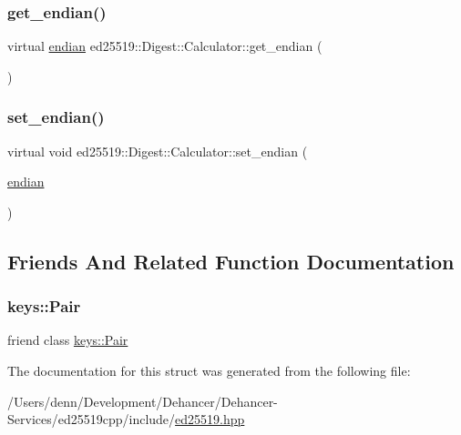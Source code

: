 \subsubsection{\texorpdfstring{get\+\_\+endian()}{get\_endian()}}
{\footnotesize\ttfamily virtual \mbox{\hyperlink{structed25519_1_1_digest_1_1_calculator_a9bbea874787f93cdf4841b30c1c0d9a3}{endian}} ed25519\+::\+Digest\+::\+Calculator\+::get\+\_\+endian (\begin{DoxyParamCaption}{ }\end{DoxyParamCaption})\hspace{0.3cm}{\ttfamily [pure virtual]}}

\mbox{\label{structed25519_1_1_digest_1_1_calculator_a2e5de160d53feaef2ce5c0240e8e13ea}} 
\subsubsection{\texorpdfstring{set\+\_\+endian()}{set\_endian()}}
{\footnotesize\ttfamily virtual void ed25519\+::\+Digest\+::\+Calculator\+::set\+\_\+endian (\begin{DoxyParamCaption}\item[{\mbox{\hyperlink{structed25519_1_1_digest_1_1_calculator_a9bbea874787f93cdf4841b30c1c0d9a3}{endian}}}]{ }\end{DoxyParamCaption})\hspace{0.3cm}{\ttfamily [pure virtual]}}



\subsection{Friends And Related Function Documentation}
\mbox{\label{structed25519_1_1_digest_1_1_calculator_ad89670fe663c8c8526b69b1bc6a87c19}} 
\subsubsection{\texorpdfstring{keys\+::\+Pair}{keys::Pair}}
{\footnotesize\ttfamily friend class \mbox{\hyperlink{classed25519_1_1keys_1_1_pair}{keys\+::\+Pair}}\hspace{0.3cm}{\ttfamily [friend]}}



The documentation for this struct was generated from the following file\+:\begin{DoxyCompactItemize}
\item 
/\+Users/denn/\+Development/\+Dehancer/\+Dehancer-\/\+Services/ed25519cpp/include/\mbox{\hyperlink{ed25519_8hpp}{ed25519.\+hpp}}\end{DoxyCompactItemize}
